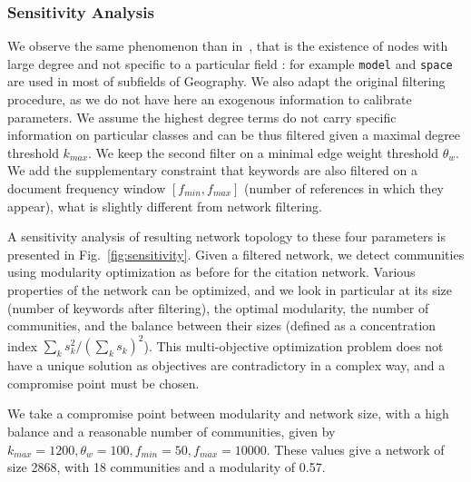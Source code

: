 \subsubsection*{Sensitivity Analysis}

We observe the same phenomenon than in~\cite{bergeaud2017classifying}, that is the existence of nodes with large degree and not specific to a particular field : for example \texttt{model} and \texttt{space} are used in most of subfields of Geography. We also adapt the original filtering procedure, as we do not have here an exogenous information to calibrate parameters. We assume the highest degree terms do not carry specific information on particular classes and can be thus filtered given a maximal degree threshold $k_{max}$. We keep the second filter on a minimal edge weight threshold $\theta_w$. We add the supplementary constraint that keywords are also filtered on a document frequency window $\left[ f_{min},f_{max} \right]$ (number of references in which they appear), what is slightly different from network filtering.

A sensitivity analysis of resulting network topology to these four parameters is presented in Fig.~\ref{fig:sensitivity}. Given a filtered network, we detect communities using modularity optimization as before for the citation network. Various properties of the network can be optimized, and we look in particular at its size (number of keywords after filtering), the optimal modularity, the number of communities, and the balance between their sizes (defined as a concentration index $\sum_k s_k^2 / (\sum_k s_k)^2$). This multi-objective optimization problem does not have a unique solution as objectives are contradictory in a complex way, and a compromise point must be chosen. 

We take a compromise point between modularity and network size, with a high balance and a reasonable number of communities, given by $k_{max} = 1200, \theta_w = 100, f_{min} = 50, f_{max} = 10000$.  These values give a network of size 2868, with 18 communities and a modularity of 0.57.


